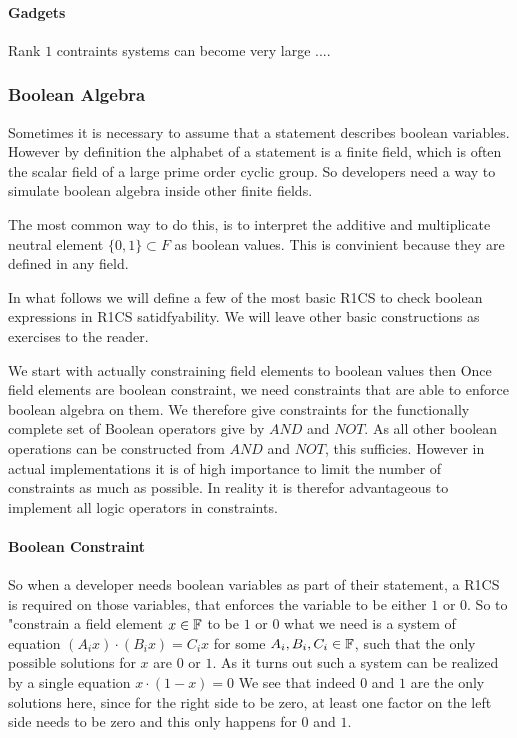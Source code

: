 \paragraph{Gadgets}
Rank $1$ contraints systems can become very large ....

\subsubsection{Boolean Algebra} 

Sometimes it is necessary to assume that a statement describes boolean variables. However by definition the alphabet of a statement is a finite field, which is often the scalar field of a large prime order cyclic group. So developers need a way to simulate boolean algebra inside other finite fields.

The most common way to do this, is to interpret the additive and multiplicate neutral element $\{0,1\}\subset F$ as boolean values. This is convinient because they are defined in any field. 

In what follows we will define a few of the most basic R1CS to check boolean expressions in R1CS satidfyability. We will leave other basic constructions as exercises to the reader. 

We start with actually constraining field elements to boolean values then   
Once field elements are boolean constraint, we need constraints that are able to enforce boolean algebra on them. We therefore give constraints for the functionally complete set of Boolean operators give by $AND$ and $NOT$. As all other boolean operations can be constructed from $AND$ and $NOT$, this sufficies. However in actual implementations it is of high importance to limit the number of constraints as much as possible. In reality it is therefor advantageous to implement all logic operators in constraints.

\paragraph{Boolean Constraint}
So when a developer needs boolean variables as part of their statement, a R1CS is required on those variables, that enforces the variable to be either $1$ or $0$. So to "constrain a field element $x\in \mathbb{F}$ to be $1$ or $0$ what we need is a system of equation $(A_ix)\cdot (B_ix) = C_ix$ for some $A_i,B_i,C_i\in \mathbb{F}$, such that the only possible solutions for $x$ are $0$ or $1$.
As it turns out such a system can be realized by a single equation
$x \cdot (1-x) =0$
We see that indeed $0$ and $1$ are the only solutions here, since for the right side to be zero, at least one factor on the left side needs to be zero and this only happens for $0$ and $1$. 

